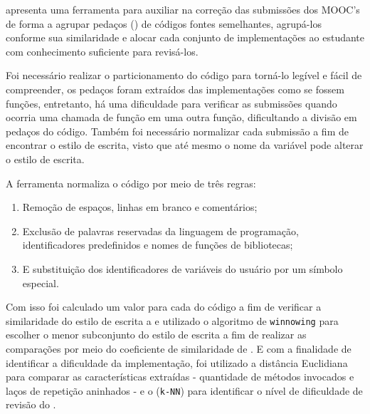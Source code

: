 	     apresenta uma ferramenta para auxiliar na correção das
	    submissões dos MOOC's de forma a agrupar pedaços () de códigos
	    fontes semelhantes, agrupá-los conforme sua similaridade e alocar cada conjunto
	    de implementações ao estudante com conhecimento suficiente para revisá-los.
	    
	    Foi necessário realizar o particionamento do código para torná-lo legível
	    e fácil de compreender, os pedaços foram extraídos das implementações como
	    se fossem funções, entretanto, há uma dificuldade para verificar as submissões
	    quando ocorria uma chamada de função em uma outra função, dificultando a divisão
	    em pedaços do código. Também foi necessário normalizar cada submissão a fim de
	    encontrar o estilo de escrita, visto que até mesmo o nome da variável pode
	    alterar o estilo de escrita.
	    
	    A ferramenta\cite{Wei2015} normaliza o código por meio de três regras:
	    \begin{enumerate}
	    	\item Remoção de espaços, linhas em branco e comentários;
	    	\item Exclusão de palavras reservadas da linguagem de programação,
	    	identificadores predefinidos e nomes de funções de bibliotecas;
	    	\item E substituição dos identificadores de variáveis do usuário por um
	    	símbolo especial.
	    \end{enumerate}
	    Com isso foi calculado um valor  para cada 
	    do código a fim de verificar a similaridade do estilo de escrita 
	    a  e utilizado o algoritmo de \texttt{winnowing} para escolher
	    o menor subconjunto do estilo de escrita a fim de realizar as comparações
	    por meio do coeficiente de similaridade de . E com a finalidade
	    de identificar a dificuldade da implementação, foi utilizado a distância
	    Euclidiana para comparar as características extraídas - quantidade de métodos
	    invocados e laços de repetição aninhados - e o 
	    (\texttt{k-NN}) para identificar o nível de dificuldade de revisão do
	    .
	    
